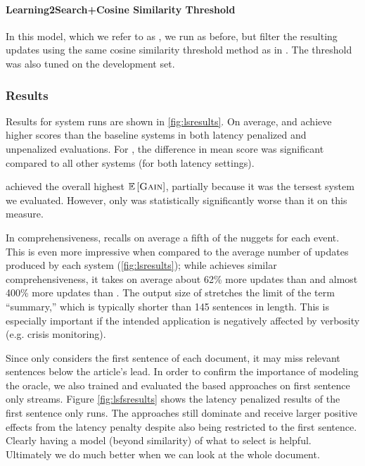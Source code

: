  \paragraph{Learning2Search+Cosine Similarity Threshold} In this model, which we
 refer to as \modelLSCos, we run \modelLS{} as before, but filter the
 resulting updates using the same cosine similarity threshold method as in
 \modelCos. The threshold was also tuned on the development set. 


 \subsubsection{Results}
 

  Results for system runs are shown in \autoref{fig:lsresults}.  On average,
  \modelLS{} and \modelLSCos{} achieve higher \fmeasure{} scores than the baseline
 systems in both latency penalized and unpenalized evaluations. For
 \modelLSCos, the difference in mean \fmeasure{} score was significant compared
 to all other systems (for both latency settings).
 
 \sap{} achieved the overall highest $\mathbb{E}\left[\textsc{Gain}\right]$, partially because
 it was the tersest system we evaluated. However, only \modelCos{} was
 statistically significantly worse than it on this measure. %
 
 In comprehensiveness, \modelLS{} recalls on average a fifth of the nuggets
 for each event. This is even more impressive when  compared to the average
 number of updates produced by each system (\autoref{fig:lsresults}); while
 \modelCos{} achieves similar comprehensiveness, it takes on average about
 62\% more updates than \modelLS{} and almost 400\% more updates than
 \modelLSCos. The output size of \modelCos{} stretches the limit of the
 term ``summary,'' which is typically shorter than 145 sentences in length.
 This is especially important if the intended application is negatively
 affected by verbosity (e.g. crisis monitoring).

 

 Since \modelCos{} only considers the first sentence of each document, it
 may miss relevant sentences below the article's lead. In order to confirm the
 importance of modeling the oracle, we also trained and evaluated the
 \modelLS{} based approaches on first sentence only streams. Figure
 \ref{fig:lsfsresults} shows the latency penalized results of the first
 sentence only runs.  The \modelLS{} approaches still dominate \modelCos{}
 and receive larger positive effects from the latency penalty despite also
 being restricted to the first sentence. Clearly having a model (beyond
 similarity) of what to select is helpful. Ultimately we do much better when
 we can look at the whole document.
  

